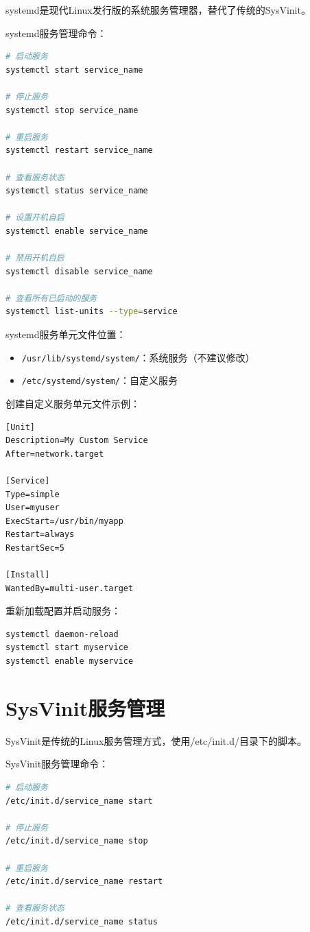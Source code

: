 \documentclass[12pt,UTF8]{ctexbook}
\begin{document}
systemd是现代Linux发行版的系统服务管理器，替代了传统的SysVinit。

systemd服务管理命令：
\begin{lstlisting}[language=bash]
# 启动服务
systemctl start service_name

# 停止服务
systemctl stop service_name

# 重启服务
systemctl restart service_name

# 查看服务状态
systemctl status service_name

# 设置开机自启
systemctl enable service_name

# 禁用开机自启
systemctl disable service_name

# 查看所有已启动的服务
systemctl list-units --type=service
\end{lstlisting}

systemd服务单元文件位置：
\begin{itemize}
    \item \texttt{/usr/lib/systemd/system/}：系统服务（不建议修改）
    \item \texttt{/etc/systemd/system/}：自定义服务
\end{itemize}

创建自定义服务单元文件示例：
\begin{lstlisting}
[Unit]
Description=My Custom Service
After=network.target

[Service]
Type=simple
User=myuser
ExecStart=/usr/bin/myapp
Restart=always
RestartSec=5

[Install]
WantedBy=multi-user.target
\end{lstlisting}

重新加载配置并启动服务：
\begin{lstlisting}[language=bash]
systemctl daemon-reload
systemctl start myservice
systemctl enable myservice
\end{lstlisting}

\section{SysVinit服务管理}
\label{sec:sysvinit}

SysVinit是传统的Linux服务管理方式，使用/etc/init.d/目录下的脚本。

SysVinit服务管理命令：
\begin{lstlisting}[language=bash]
# 启动服务
/etc/init.d/service_name start

# 停止服务
/etc/init.d/service_name stop

# 重启服务
/etc/init.d/service_name restart

# 查看服务状态
/etc/init.d/service_name status
\end{lstlisting}
\end{document}
